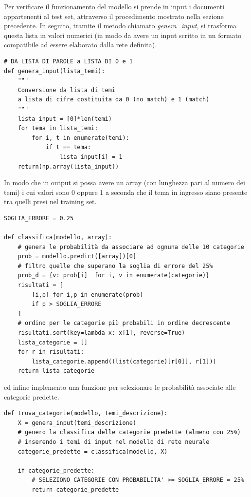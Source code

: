 \documentclass[10pt,a4paper]{report}
\begin{document}
Per verificare il funzionamento del modello si prende in input i documenti appartenenti al test set, attraverso il procedimento mostrato nella sezione precedente.
In seguito, tramite il metodo chiamato \textit{genera\_input}, si trasforma questa lista in valori numerici (in modo da avere un input scritto in un formato compatibile ad essere elaborato dalla rete definita).

\begin{verbatim}
# DA LISTA DI PAROLE a LISTA DI 0 e 1
def genera_input(lista_temi):
    """
    Conversione da lista di temi
    a lista di cifre costituita da 0 (no match) e 1 (match)
    """
    lista_input = [0]*len(temi) 
    for tema in lista_temi:
        for i, t in enumerate(temi):
            if t == tema: 
                lista_input[i] = 1
    return(np.array(lista_input))
\end{verbatim}
In modo che in output si possa avere un array (con lunghezza pari al numero dei temi) i cui valori sono 0 oppure 1 a seconda che il tema in ingresso siano presente tra quelli presi nel training set. 

\begin{verbatim}
SOGLIA_ERRORE = 0.25

def classifica(modello, array):
    # genera le probabilità da associare ad ognuna delle 10 categorie
    prob = modello.predict([array])[0] 
    # filtro quelle che superano la soglia di errore del 25%
    prob_d = {v: prob[i]  for i, v in enumerate(categorie)}
    risultati = [
        [i,p] for i,p in enumerate(prob) 
        if p > SOGLIA_ERRORE
    ]
    # ordino per le categorie più probabili in ordine decrescente
    risultati.sort(key=lambda x: x[1], reverse=True)
    lista_categorie = []
    for r in risultati:
        lista_categorie.append((list(categorie)[r[0]], r[1]))
    return lista_categorie
\end{verbatim}

ed infine implemento una funzione per selezionare le probabilità associate alle categorie predette.

\begin{verbatim}
def trova_categorie(modello, temi_descrizione):
    X = genera_input(temi_descrizione)
    # genero la classifica delle categorie predette (almeno con 25%)
    # inserendo i temi di input nel modello di rete neurale  
    categorie_predette = classifica(modello, X)
    
    if categorie_predette:
        # SELEZIONO CATEGORIE CON PROBABILITA' >= SOGLIA_ERRORE = 25%
        return categorie_predette
\end{verbatim}
\end{document}
